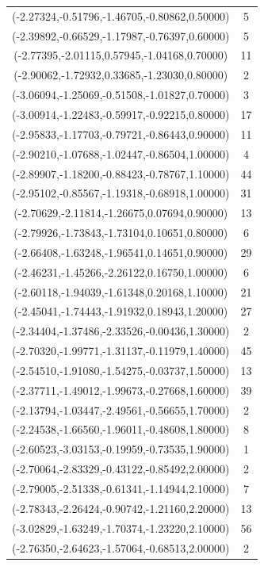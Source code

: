 \documentclass[12pt, fullpage,letterpaper]{article}
\begin{document}
\begin{longtable}{c|c}
(-2.27324,-0.51796,-1.46705,-0.80862,0.50000) & 5 \\
(-2.39892,-0.66529,-1.17987,-0.76397,0.60000) & 5 \\
(-2.77395,-2.01115,0.57945,-1.04168,0.70000) & 11 \\
(-2.90062,-1.72932,0.33685,-1.23030,0.80000) & 2 \\
(-3.06094,-1.25069,-0.51508,-1.01827,0.70000) & 3 \\
(-3.00914,-1.22483,-0.59917,-0.92215,0.80000) & 17 \\
(-2.95833,-1.17703,-0.79721,-0.86443,0.90000) & 11 \\
(-2.90210,-1.07688,-1.02447,-0.86504,1.00000) & 4 \\
(-2.89907,-1.18200,-0.88423,-0.78767,1.10000) & 44 \\
(-2.95102,-0.85567,-1.19318,-0.68918,1.00000) & 31 \\
(-2.70629,-2.11814,-1.26675,0.07694,0.90000) & 13 \\
(-2.79926,-1.73843,-1.73104,0.10651,0.80000) & 6 \\
(-2.66408,-1.63248,-1.96541,0.14651,0.90000) & 29 \\
(-2.46231,-1.45266,-2.26122,0.16750,1.00000) & 6 \\
(-2.60118,-1.94039,-1.61348,0.20168,1.10000) & 21 \\
(-2.45041,-1.74443,-1.91932,0.18943,1.20000) & 27 \\
(-2.34404,-1.37486,-2.33526,-0.00436,1.30000) & 2 \\
(-2.70320,-1.99771,-1.31137,-0.11979,1.40000) & 45 \\
(-2.54510,-1.91080,-1.54275,-0.03737,1.50000) & 13 \\
(-2.37711,-1.49012,-1.99673,-0.27668,1.60000) & 39 \\
(-2.13794,-1.03447,-2.49561,-0.56655,1.70000) & 2 \\
(-2.24538,-1.66560,-1.96011,-0.48608,1.80000) & 8 \\
(-2.60523,-3.03153,-0.19959,-0.73535,1.90000) & 1 \\
(-2.70064,-2.83329,-0.43122,-0.85492,2.00000) & 2 \\
(-2.79005,-2.51338,-0.61341,-1.14944,2.10000) & 7 \\
(-2.78343,-2.26424,-0.90742,-1.21160,2.20000) & 13 \\
(-3.02829,-1.63249,-1.70374,-1.23220,2.10000) & 56 \\
(-2.76350,-2.64623,-1.57064,-0.68513,2.00000) & 2 \\

\end{longtable}
\end{document}
